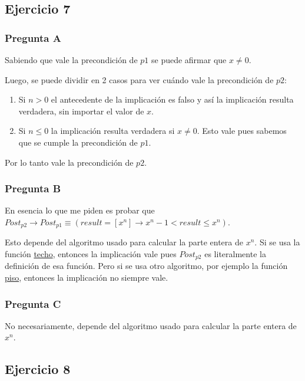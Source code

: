\subsection{Ejercicio 7}

\subsubsection{Pregunta A}

Sabiendo que vale la precondición de $p1$ se puede afirmar que $x \neq 0$.

Luego, se puede dividir en 2 casos para ver cuándo vale la precondición de $p2$:

\begin{enumerate}[1)]
    \item Si $n > 0$ el antecedente de la implicación es falso y así la implicación resulta verdadera, sin importar el valor de $x$.
    \item Si $n \leq 0$ la implicación resulta verdadera si $x \neq 0$. Esto vale pues sabemos que se cumple la precondición de $p1$.
\end{enumerate}

Por lo tanto vale la precondición de $p2$.

\subsubsection{Pregunta B}

En esencia lo que me piden es probar que $Post_{p2} \rightarrow Post_{p1} \equiv (result = [x^n] \rightarrow x^n - 1 < result \leq x^n)$.

Esto depende del algoritmo usado para calcular la parte entera de $x^n$. Si se usa la función \href{https://es.wikipedia.org/wiki/Funciones_de_parte_entera#Funci%C3%B3n_techo}{techo}, entonces la implicación vale pues $Post_{p2}$ es literalmente la definición de esa función. Pero si se usa otro algoritmo, por ejemplo la función \href{https://es.wikipedia.org/wiki/Funciones_de_parte_entera#Funci%C3%B3n_piso/suelo}{piso}, entonces la implicación no siempre vale.

\subsubsection{Pregunta C}

No necesariamente, depende del algoritmo usado para calcular la parte entera de $x^n$.

\subsection{Ejercicio 8}

